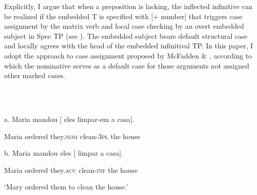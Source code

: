 \documentclass[output=paper]{langsci/langscibook}
\begin{document}
  Explicitly, I argue that when a preposition is lacking, the inflected infinitive can be realized if the embedded T is specified with [+ number] that triggers case assignment by the matrix verb and local case checking by an overt embedded subject in Spec TP (see \citealt{Raposo1987}). The embedded subject bears default structural case and locally agrees with the head of the embedded infinitival TP. In this paper, I adopt the approach to case assignment proposed by McFadden \& \citet{Sundaresan2011}, according to which the nominative serves as a default case for those arguments not assigned other marked cases.

\ea%
    \label{ex:moreno:28}
    \gll\\
        \\
    \glt
    \z

           a.  Maria mandou [ eles          limpar-em   a     casa].    

    Maria ordered   they.\textsc{nom}   clean-\textsc{3pl}     the house

b.  Maria mandou   eles [  limpar      a    casa].

    Maria ordered   they.\textsc{acc}   clean-\textsc{inf} the house

    ‘Mary ordered them to clean the house.’
\end{document}

